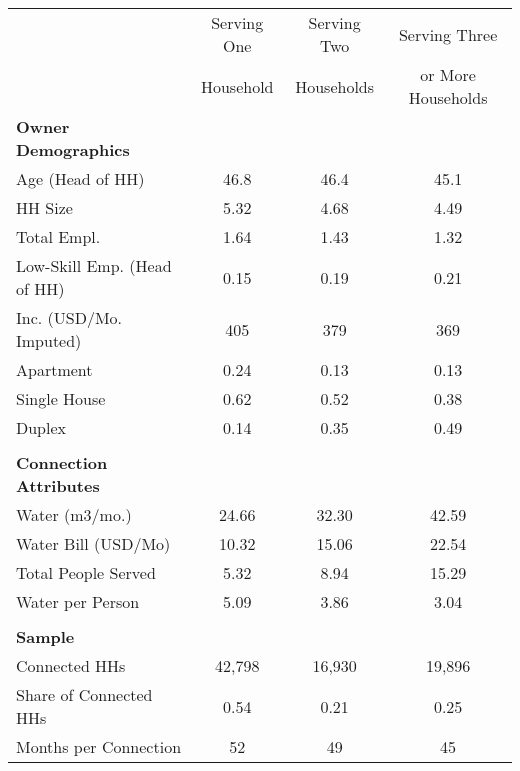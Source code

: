 \begin{tabular}{l*{1}{ccc}}
 &Serving One &Serving Two &Serving Three  \\
 &Household &Households &or More Households  \\
\hline

\textbf{Owner Demographics} &\multicolumn{3}{c}{ }\\
Age (Head of HH) &       46.8  &       46.4  &       45.1   \\
HH Size &       5.32  &       4.68  &       4.49   \\
Total Empl. &       1.64  &       1.43  &       1.32   \\
Low-Skill Emp. (Head of HH) &         0.15 &          0.19 &         0.21  \\
Inc. (USD/Mo. Imputed) &        405  &        379  &        369   \\
Apartment &          0.24 &          0.13 &          0.13  \\
Single House &          0.62 &          0.52 &          0.38  \\
Duplex &          0.14  &          0.35 &          0.49  \\
 & &  & \\
\textbf{Connection Attributes} &\multicolumn{3}{c}{ }\\
Water (m3/mo.) &      24.66  &      32.30  &      42.59   \\
Water Bill (USD/Mo) &      10.32  &      15.06  &      22.54   \\
Total People Served &       5.32  &       8.94  &      15.29   \\
Water per Person &       5.09  &       3.86  &       3.04   \\
 & &  &  \\
\textbf{Sample} &\multicolumn{3}{c}{ }\\
Connected HHs &     42,798  &     16,930  &     19,896   \\
Share of Connected HHs &          0.54 &          0.21 &          0.25  \\
Months per Connection &         52  &         49  &         45   \\
\hline
\end{tabular}